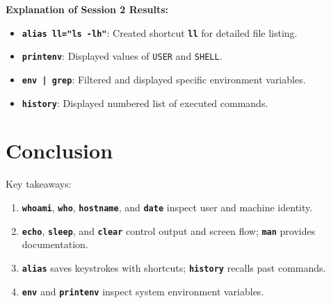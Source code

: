 \documentclass[10pt,a4paper]{article}
\newcommand{\cmd}[1]{\texttt{\textbf{#1}}}
\begin{document}
\vspace{2pt}\noindent\textbf{Explanation of Session 2 Results:}\par\vspace{1pt}
\begin{itemize}[noitemsep,topsep=1pt,leftmargin=1.2em]
  \item \cmd{alias ll="ls -lh"}: Created shortcut \cmd{ll} for detailed file listing.
  \item \cmd{printenv}: Displayed values of \texttt{USER} and \texttt{SHELL}.
  \item \cmd{env | grep}: Filtered and displayed specific environment variables.
  \item \cmd{history}: Displayed numbered list of executed commands.
\end{itemize}

\section{Conclusion}
Key takeaways:
\begin{enumerate}[noitemsep,topsep=1pt,leftmargin=1.4em]
  \item \cmd{whoami}, \cmd{who}, \cmd{hostname}, and \cmd{date} inspect user and machine identity.
  \item \cmd{echo}, \cmd{sleep}, and \cmd{clear} control output and screen flow; \cmd{man} provides documentation.
  \item \cmd{alias} saves keystrokes with shortcuts; \cmd{history} recalls past commands.
  \item \cmd{env} and \cmd{printenv} inspect system environment variables.
\end{enumerate}
\end{document}
